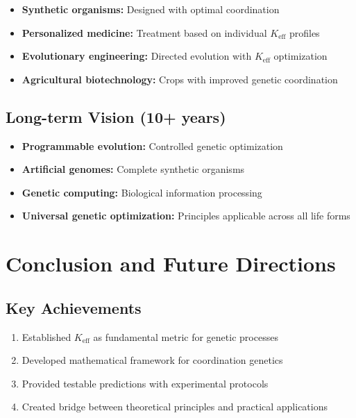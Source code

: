 \documentclass[12pt]{article}
\begin{document}
	\begin{itemize}
		\item \textbf{Synthetic organisms:} Designed with optimal coordination
		\item \textbf{Personalized medicine:} Treatment based on individual $K_{\text{eff}}$ profiles
		\item \textbf{Evolutionary engineering:} Directed evolution with $K_{\text{eff}}$ optimization
		\item \textbf{Agricultural biotechnology:} Crops with improved genetic coordination
	\end{itemize}
	
	\subsection{Long-term Vision (10+ years)}
	
	\begin{itemize}
		\item \textbf{Programmable evolution:} Controlled genetic optimization
		\item \textbf{Artificial genomes:} Complete synthetic organisms
		\item \textbf{Genetic computing:} Biological information processing
		\item \textbf{Universal genetic optimization:} Principles applicable across all life forms
	\end{itemize}
	
	\section{Conclusion and Future Directions}
	
	\subsection{Key Achievements}
	
	\begin{enumerate}
		\item Established $K_{\text{eff}}$ as fundamental metric for genetic processes
		\item Developed mathematical framework for coordination genetics
		\item Provided testable predictions with experimental protocols
		\item Created bridge between theoretical principles and practical applications
	\end{enumerate}
	
\end{document}
